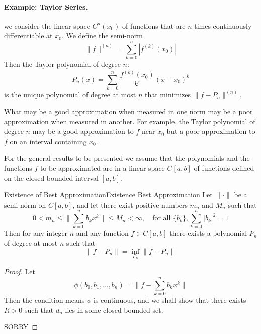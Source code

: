 \documentclass[../main.tex]{subfiles}
\begin{document}
\paragraph{Example: Taylor Series.} we consider the linear space $C^n(x_0)$ of functions that are $n$ times continuously differentiable at $x_0$. We define the semi-norm
\begin{equation}
	\| f \|^{(n)} = \sum_{k=0}^n |f^{(k)}(x_0)|
\end{equation}
Then the Taylor polynomial of degree $n$:
\begin{equation}
	P_n(x) = \sum_{k=0}^n \frac{f^{(k)}(x_0)}{k!} (x - x_0)^k
\end{equation}
is the unique polynomial of degree at most $n$ that minimizes $\| f - P_n \|^{(n)}$.

\begin{remark}
	What may be a good approximation when measured in one norm may be a poor approximation when measured in another. For example, the Taylor polynomial of degree $n$ may be a good approximation to $f$ near $x_0$ but a poor approximation to $f$ on an interval containing $x_0$.
\end{remark}

For the general results to be presented we assume that the polynomials and the functions $f$ to be approximated are in a linear space $C[a,b]$ of functions defined on the closed bounded interval $[a,b]$.
\begin{theorem}{Existence of Best Approximation}{Existence Best Approximation}
	Let $\| \cdot \|$ be a semi-norm on $C[a,b]$, and let there exist positive numbers $m_n$ and $M_n$ such that
	\begin{equation}
		0 < m_n \leq \| \sum_{k=0}^n b_k x^k \| \leq M_n < \infty, \quad \text{for all } \{b_k\}, \sum_{k=0}^n |b_k|^2 = 1
	\end{equation}
	Then for any integer $n$ and any function $f \in C[a,b]$ there exists a polynomial $P_n$ of degree at most $n$ such that
	\begin{equation}
		\| f - P_n \| = \inf_{P_n} \| f - P_n \|
	\end{equation}
\end{theorem}
\begin{proof}
	Let
	\begin{equation*}
		\phi(b_0, b_1, \dots, b_n) = \| f - \sum_{k=0}^n b_k x^k \|
	\end{equation*}
	Then the condition means $\phi$ is continuous, and we shall show that there exists $R>0$ such that $d_n$ lies in some closed bounded set.

	SORRY
\end{proof}
\end{document}
